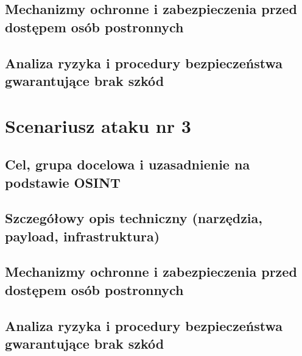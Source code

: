 \subsection{Mechanizmy ochronne i zabezpieczenia przed dostępem osób postronnych}\label{subsec:scen2-zabezpieczenia}
\subsection{Analiza ryzyka i procedury bezpieczeństwa gwarantujące brak szkód}\label{subsec:scen2-ryzyko}

\section{Scenariusz ataku nr 3}\label{sec:scenariusz-3}
\subsection{Cel, grupa docelowa i uzasadnienie na podstawie OSINT}\label{subsec:scen3-cel}
\subsection{Szczegółowy opis techniczny (narzędzia, payload, infrastruktura)}\label{subsec:scen3-techniczny}
\subsection{Mechanizmy ochronne i zabezpieczenia przed dostępem osób postronnych}\label{subsec:scen3-zabezpieczenia}
\subsection{Analiza ryzyka i procedury bezpieczeństwa gwarantujące brak szkód}\label{subsec:scen3-ryzyko}

